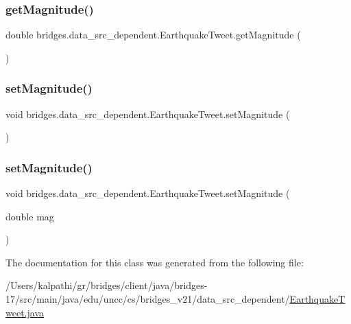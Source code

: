 \subsubsection{\texorpdfstring{get\+Magnitude()}{getMagnitude()}}
{\footnotesize\ttfamily double bridges.\+data\+\_\+src\+\_\+dependent.\+Earthquake\+Tweet.\+get\+Magnitude (\begin{DoxyParamCaption}{ }\end{DoxyParamCaption})}

\mbox{\label{classbridges_1_1data__src__dependent_1_1_earthquake_tweet_a49880f314eee430098ca347cd07ff470}} 
\subsubsection{\texorpdfstring{set\+Magnitude()}{setMagnitude()}\hspace{0.1cm}{\footnotesize\ttfamily [1/2]}}
{\footnotesize\ttfamily void bridges.\+data\+\_\+src\+\_\+dependent.\+Earthquake\+Tweet.\+set\+Magnitude (\begin{DoxyParamCaption}{ }\end{DoxyParamCaption})}

\mbox{\label{classbridges_1_1data__src__dependent_1_1_earthquake_tweet_a763d8a261a563e66af95c5a97850ecc0}} 
\subsubsection{\texorpdfstring{set\+Magnitude()}{setMagnitude()}\hspace{0.1cm}{\footnotesize\ttfamily [2/2]}}
{\footnotesize\ttfamily void bridges.\+data\+\_\+src\+\_\+dependent.\+Earthquake\+Tweet.\+set\+Magnitude (\begin{DoxyParamCaption}\item[{double}]{mag }\end{DoxyParamCaption})}



The documentation for this class was generated from the following file\+:\begin{DoxyCompactItemize}
\item 
/\+Users/kalpathi/gr/bridges/client/java/bridges-\/17/src/main/java/edu/uncc/cs/bridges\+\_\+v21/data\+\_\+src\+\_\+dependent/\mbox{\hyperlink{_earthquake_tweet_8java}{Earthquake\+Tweet.\+java}}\end{DoxyCompactItemize}
